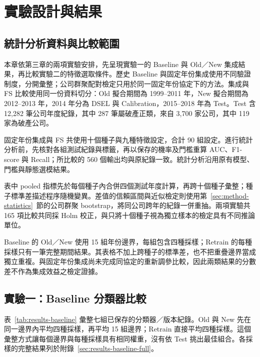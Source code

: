 \chapter{實驗設計與結果}\label{chap:results}
\begingroup
\setlength{\emergencystretch}{2em}

\section{統計分析資料與比較範圍}

本章依第三章的兩項實驗安排，先呈現實驗一的 Baseline 與 Old／New 集成結果，再比較實驗二的特徵選取條件。歷史 Baseline 與固定年份集成使用不同驗證制度，分開彙整；公司群聚配對檢定只用於同一固定年份協定下的方法。集成與 FS 比較使用同一份資料切分：Old 擬合期間為 1999--2011 年，New 擬合期間為 2012--2013 年，2014 年分為 DSEL 與 Calibration，2015--2018 年為 Test。Test 含 12,282 筆公司年度紀錄，其中 287 筆屬破產正類，來自 3,700 家公司，其中 119 家為破產公司。

固定年份集成與 FS 共使用十個種子與九種特徵設定，合計 90 組設定。進行統計分析前，先核對各組測試紀錄與標籤，再以保存的機率及門檻重算 AUC、F1-score 與 Recall；所比較的 560 個輸出均與原紀錄一致。統計分析沿用原有模型、門檻與靜態選模結果。

表中 pooled 指標先於每個種子內合併四個測試年度計算，再跨十個種子彙整；種子標準差描述程序隨機變異。差值的信賴區間與近似檢定則使用第~\ref{sec:method-statistics}~節的公司群聚 bootstrap，將同公司跨年的紀錄一併重抽。兩項實驗共 165 項比較共同採 Holm 校正，與只將十個種子視為獨立樣本的檢定具有不同推論單位。

Baseline 的 Old／New 使用 15 組年份邊界，每組包含四種採樣；Retrain 的每種採樣只有一筆完整期間結果。其表格不加上跨種子的標準差，也不把重疊邊界當成獨立重複。與固定年份集成尚未完成同協定的重新調參比較，因此兩類結果的分數差不作為集成效益之檢定證據。

\section{實驗一：Baseline 分類器比較}\label{sec:results-baseline}

表~\ref{tab:results-baseline} 彙整七組已保存的分類器／版本紀錄。Old 與 New 先在同一邊界內平均四種採樣，再平均 15 組邊界；Retrain 直接平均四種採樣。這個彙整方式讓每個邊界與每種採樣具有相同權重，沒有依 Test 挑出最佳組合。各採樣的完整結果列於附錄~\ref{sec:results-baseline-full}。



